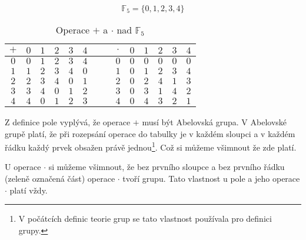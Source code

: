 \begin{example}
    $$\mathbb{F}_5 = \{0, 1, 2, 3, 4\}$$
\begin{table}[h]
    \centering
    \begin{tabular}{|c|c|c|c|c|c|c|c|c|c|c|c|c|c|}
    \hline
    $+$ &
      $0$ &
      $1$ &
      $2$ &
      $3$ &
      $4$ &
       &
       &
      $\cdot$ &
      $0$ &
      $1$ &
      $2$ &
      $3$ &
      $4$ \\ \hline
    $0$ &
      $0$ &
      $1$ &
      $2$ &
      $3$ &
      $4$ &
       &
       &
      $0$ &
      $0$ &
      $0$ &
      $0$ &
      $0$ &
      $0$ \\ \hline
    $1$ &
      $1$ &
      \cellcolor[HTML]{FFFFFF}$2$ &
      \cellcolor[HTML]{FFFFFF}$3$ &
      \cellcolor[HTML]{FFFFFF}$4$ &
      \cellcolor[HTML]{FFFFFF}$0$ &
       &
       &
      $1$ &
      $0$ &
      \cellcolor[HTML]{34FF34}$1$ &
      \cellcolor[HTML]{34FF34}$2$ &
      \cellcolor[HTML]{34FF34}$3$ &
      \cellcolor[HTML]{34FF34}$4$ \\ \hline
    $2$ &
      $2$ &
      \cellcolor[HTML]{FFFFFF}$3$ &
      \cellcolor[HTML]{FFFFFF}$4$ &
      \cellcolor[HTML]{FFFFFF}$0$ &
      \cellcolor[HTML]{FFFFFF}$1$ &
       &
       &
      $2$ &
      $0$ &
      \cellcolor[HTML]{34FF34}$2$ &
      \cellcolor[HTML]{34FF34}$4$ &
      \cellcolor[HTML]{34FF34}$1$ &
      \cellcolor[HTML]{34FF34}$3$ \\ \hline
    $3$ &
      $3$ &
      \cellcolor[HTML]{FFFFFF}$4$ &
      \cellcolor[HTML]{FFFFFF}$0$ &
      \cellcolor[HTML]{FFFFFF}$1$ &
      \cellcolor[HTML]{FFFFFF}$2$ &
       &
       &
      $3$ &
      $0$ &
      \cellcolor[HTML]{34FF34}$3$ &
      \cellcolor[HTML]{34FF34}$1$ &
      \cellcolor[HTML]{34FF34}$4$ &
      \cellcolor[HTML]{34FF34}$2$ \\ \hline
    $4$ &
      $4$ &
      \cellcolor[HTML]{FFFFFF}$0$ &
      \cellcolor[HTML]{FFFFFF}$1$ &
      \cellcolor[HTML]{FFFFFF}$2$ &
      \cellcolor[HTML]{FFFFFF}$3$ &
       &
       &
      $4$ &
      $0$ &
      \cellcolor[HTML]{34FF34}$4$ &
      \cellcolor[HTML]{34FF34}$3$ &
      \cellcolor[HTML]{34FF34}$2$ &
      \cellcolor[HTML]{34FF34}$1$ \\ \hline
    \end{tabular}
    \caption{Operace $+$ a $\cdot$ nad $\mathbb{F}_{5}$}
    \label{tab:F5}
    \end{table}

    Z definice pole vyplývá, že operace $+$ musí být Abelovská grupa. V Abelovské grupě
    platí, že při rozepsání operace do tabulky je v každém sloupci a v každém řádku každý
    prvek obsažen právě jednou\footnote{V počátcích definic teorie grup se tato vlastnost
    používala pro definici grupy.}. Což si můžeme všimnout že zde platí.

    U operace $\cdot$ si můžeme všimnout, že bez prvního sloupce a bez prvního řádku
    (zeleně označená část) operace $\cdot$ tvoří grupu. Tato vlastnost u pole a jeho
    operace $\cdot$ platí vždy.
\end{example}

